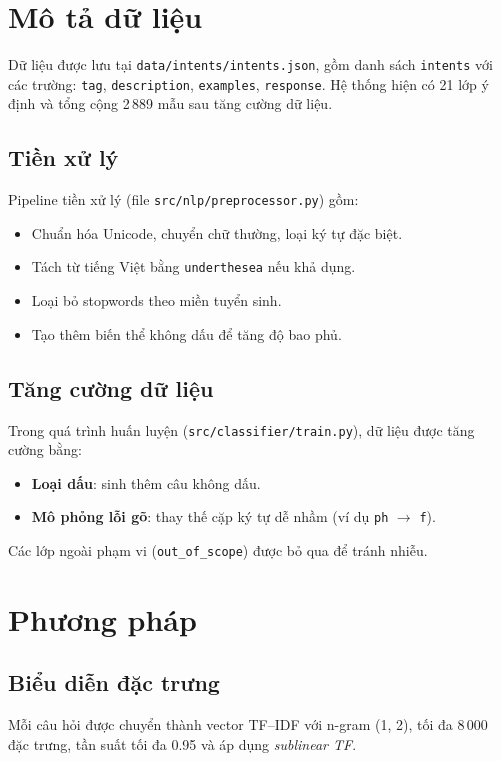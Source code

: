 \documentclass[12pt,a4paper]{article}
\begin{document}
\section{Mô tả dữ liệu}
Dữ liệu được lưu tại \texttt{data/intents/intents.json}, gồm danh sách \texttt{intents} với các trường:
\texttt{tag}, \texttt{description}, \texttt{examples}, \texttt{response}. Hệ thống hiện có 21 lớp ý định
và tổng cộng 2\,889 mẫu sau tăng cường dữ liệu.

\subsection{Tiền xử lý}
Pipeline tiền xử lý (file \texttt{src/nlp/preprocessor.py}) gồm:
\begin{itemize}
    \item Chuẩn hóa Unicode, chuyển chữ thường, loại ký tự đặc biệt.
    \item Tách từ tiếng Việt bằng \texttt{underthesea} nếu khả dụng.
    \item Loại bỏ stopwords theo miền tuyển sinh.
    \item Tạo thêm biến thể không dấu để tăng độ bao phủ.
\end{itemize}

\subsection{Tăng cường dữ liệu}
Trong quá trình huấn luyện (\texttt{src/classifier/train.py}), dữ liệu được tăng cường bằng:
\begin{itemize}
    \item \textbf{Loại dấu}: sinh thêm câu không dấu.
    \item \textbf{Mô phỏng lỗi gõ}: thay thế cặp ký tự dễ nhầm (ví dụ \texttt{ph} $\rightarrow$ \texttt{f}).
\end{itemize}
Các lớp ngoài phạm vi (\texttt{out\_of\_scope}) được bỏ qua để tránh nhiễu.

\section{Phương pháp}
\subsection{Biểu diễn đặc trưng}
Mỗi câu hỏi được chuyển thành vector TF--IDF với n-gram (1, 2), tối đa 8\,000 đặc trưng, tần suất tối đa 0.95
và áp dụng \textit{sublinear TF}.
\end{document}
